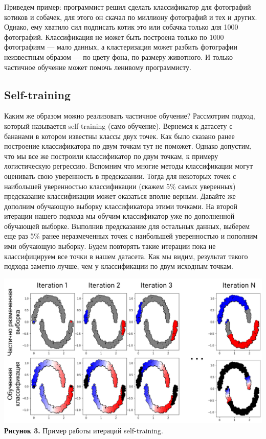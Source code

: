 Приведем пример: программист решил сделать классификатор для фотографий котиков и собачек, для этого он скачал по миллиону фотографий и тех и других. Однако, ему хватило сил подписать котик это или собачка только для 1000 фотографий. Классификация не может быть построена только по 1000 фотографиям --- мало данных, а кластеризация может разбить фотографии неизвестным образом --- по цвету фона, по размеру животного. И только частичное обучение может помочь ленивому программисту.
\subsection{Self-training}
Каким же образом можно реализовать частичное обучение? Рассмотрим подход, который называется self-training (само-обучение). Вернемся к датасету с бананами в котором известны классы двух точек. Как было сказано ранее построение классификатора по двум точкам тут не поможет. Однако допустим, что мы все же построили классификатор по двум точкам, к примеру логистическую регрессию. Вспомним что многие методы классификации могут оценивать свою уверенность в предсказании. Тогда для некоторых точек с наибольшей уверенностью классификации (скажем 5\% самых уверенных) предсказание  классификации может оказаться вполне верным. Давайте же дополним обучающую выборку классификатора этими точками. На второй итерации нашего подхода мы обучим классификатор уже по дополненной обучающей выборке. Выполнив предсказание для остальных данных, выберем еще раз 5\% ранее неразмеченных точек с наибольшей уверенностью и пополним ими обучающую выборку. Будем повторять такие итерации пока не классифицируем все точки в нашем датасета. Как мы видим, результат такого подхода заметно лучше, чем у классификации по двум исходным точкам. 
\begin{center}
\includegraphics[width=1.0\textwidth]{picture_3.png}
\textbf{Рисунок 3.} Пример работы итераций self-training. 
\end{center}
